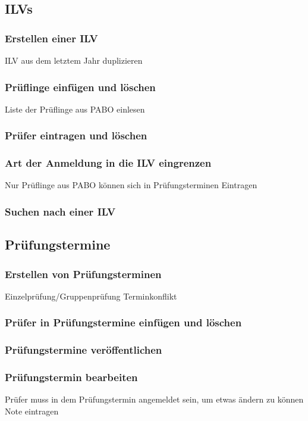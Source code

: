 \subsection{ILVs}
\subsubsection{Erstellen einer ILV}
ILV aus dem letztem Jahr duplizieren

\subsubsection{Prüflinge einfügen und löschen}
Liste der Prüflinge aus PABO einlesen

\subsubsection{Prüfer eintragen und löschen}

\subsubsection{Art der Anmeldung in die ILV eingrenzen}
Nur Prüflinge aus PABO können sich in Prüfungsterminen Eintragen
\subsubsection{Suchen nach einer ILV}



\subsection{Prüfungstermine}
\subsubsection{Erstellen von Prüfungsterminen}
Einzelprüfung/Gruppenprüfung
Terminkonflikt
\subsubsection{Prüfer in Prüfungstermine einfügen und löschen}
\subsubsection{Prüfungstermine veröffentlichen}
\subsubsection{Prüfungstermin bearbeiten}
Prüfer muss in dem Prüfungstermin angemeldet sein, um etwas ändern zu können
Note eintragen
